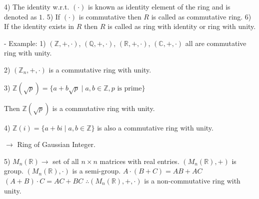 4) The identity w.r.t. $(\cdot)$ is known as identity element of the ring and is denoted as $1$.
5) If $(\cdot)$ is commutative then $R$ is called as commutative ring.
6) If the identity exists in $R$ then $R$ is called as ring with identity or ring with unity.

- Example: 1) $(\mathbb{Z}, +, \cdot)$, $(\mathbb{Q}, +, \cdot)$, $(\mathbb{R}, +, \cdot)$, $(\mathbb{C}, +, \cdot)$ all are commutative ring with unity.

2) $(\mathbb{Z}_n, +, \cdot)$ is a commutative ring with unity.

3) $\mathbb{Z}(\sqrt{p}) = \{a + b\sqrt{p} \mid a, b \in \mathbb{Z}, p \text{ is prime}\}$

Then $\mathbb{Z}(\sqrt{p})$ is a commutative ring with unity.

4) $\mathbb{Z}(i) = \{a + bi \mid a, b \in \mathbb{Z}\}$ is also a commutative ring with unity.

$\rightarrow$ Ring of Gaussian Integer.

5) $M_n(\mathbb{R}) \rightarrow$ set of all $n \times n$ matrices with real entries.
$(M_n(\mathbb{R}), +)$ is group.
$(M_n(\mathbb{R}), \cdot)$ is a semi-group.
$A \cdot (B + C) = AB + AC$
$(A + B) \cdot C = AC + BC$
$\therefore (M_n(\mathbb{R}), +, \cdot)$ is a non-commutative ring with unity.

